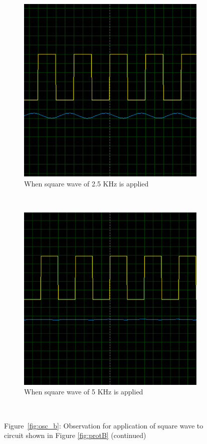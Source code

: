 \documentclass{lab_sheet}
\begin{document}
\begin{figure}[H]
   \ContinuedFloat
   \centering
   \begin{subfigure}{0.49\textwidth}
      \centering
   \includegraphics[width=0.9\linewidth]{../Figures/osc_b_4.png}
   \caption{When square wave of 2.5 KHz is applied}
   \end{subfigure}~
   \begin{subfigure}{0.49\textwidth}
      \centering
   \includegraphics[width=0.9\linewidth]{../Figures/osc_b_3.png}
   \caption{When square wave of 5 KHz is applied}
   \end{subfigure}~
      \caption*{Figure~\ref{fig:osc_b}: Observation for application of square wave to circuit shown in Figure \ref{fig:protB} (continued)}
\end{figure}
\end{document}
